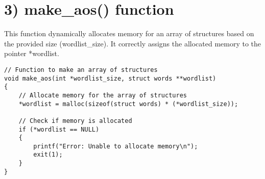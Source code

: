 \documentclass[a4paper,11pt]{article}
\theoremstyle{mytheor}
\begin{document}
\section*{3) make\_aos() function}
This function dynamically allocates memory for an array of structures based on the provided size (wordlist\_size). It correctly assigns the allocated memory to the pointer *wordlist.
\begin{lstlisting}[label={list:third},caption=make\_aos() function]
// Function to make an array of structures
void make_aos(int *wordlist_size, struct words **wordlist)
{   
    // Allocate memory for the array of structures
    *wordlist = malloc(sizeof(struct words) * (*wordlist_size));
    
    // Check if memory is allocated
    if (*wordlist == NULL)
    {
        printf("Error: Unable to allocate memory\n");
        exit(1);
    }
}
\end{lstlisting}
\end{document}
